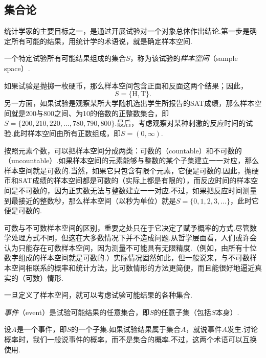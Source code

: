 \subsection{集合论}\label{sec:1.1}
统计学家的主要目标之一，是通过开展试验对一个对象总体作出结论.第一步是确定所有可能的结果，用统计学的术语说，就是确定样本空间.
\begin{definition}\label{def:1.1.1}
一个特定试验所有可能结果组成的集合$S$，称为该试验的\emph{样本空间}（sample space）.
\end{definition}
如果试验是抛掷一枚硬币，那么样本空间包含正面和反面这两个结果；因此，
$$S=\{\mathrm H,\mathrm T\}.$$
另一方面，如果试验是观察某所大学随机选出学生所报告的SAT成绩，那么样本空间就是200与800之间、为10的倍数的正整数集合，即$S=\{200,210,220,\ldots,780,790,800\}$.最后，考虑观察对某种刺激的反应时间的试验.此时样本空间由所有正数组成，即$S=(0,\infty)$.

按照元素个数，可以把样本空间分成两类：可数的（countable）和不可数的（uncountable）.如果样本空间的元素能够与整数的某个子集建立一一对应，那么样本空间就是可数的.当然，如果它只包含有限个元素，它便是可数的.因此，抛硬币和SAT成绩的样本空间都是可数的（实际上都是有限的），而反应时间的样本空间是不可数的，因为正实数无法与整数建立一一对应.不过，如果把反应时间测量到最接近的整数秒，那么样本空间（以秒为单位）就是$S=\{0,1,2,3,\ldots\}$，此时它便是可数的.



可数与不可数样本空间的区别，重要之处只在于它决定了赋予概率的方式.尽管数学处理方式不同，但这在大多数情况下并不造成问题.从哲学层面看，人们或许会认为只能存在可数样本空间，因为测量不可能具有无限精度.（例如，由所有十位数字组成的样本空间就是可数的.）实际情况固然如此，但一般说来，与不可数样本空间相联系的概率和统计方法，比可数情形的方法更简便，而且能很好地逼近真实的（可数）情形.

一旦定义了样本空间，就可以考虑试验可能结果的各种集合.
\begin{definition}\label{def:1.1.2}
\emph{事件}（event）是试验可能结果的任意集合，即$S$的任意子集（包括$S$本身）.
\end{definition}
设$A$是一个事件，即$S$的一个子集.如果试验结果属于集合$A$，就说事件$A$发生.讨论概率时，我们一般说事件的概率，而不是集合的概率.不过，这两个术语可以互换使用.

